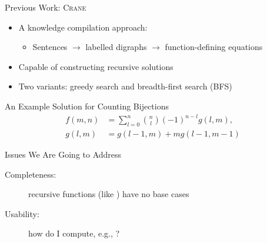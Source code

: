 \documentclass{beamer}
\begin{document}
\begin{frame}{Previous Work:
    \textsc{Crane}~}
  \begin{itemize}
    \item A knowledge compilation approach:
          \begin{itemize}
            \item \alert{Sentences} $\to$ labelled \alert{digraphs} $\to$
                  function-defining \alert{equations}
          \end{itemize}
    \item Capable of constructing recursive solutions
    \item Two variants: \alert{greedy} search and \alert{breadth-first search}
          (BFS)
  \end{itemize}
  \pause
  \begin{exampleblock}{An Example Solution for Counting Bijections}
    \begin{align*}
      f(m, n) &= \sum_{l=0}^{n} \binom{n}{l}{(-1)}^{n-l}g(l, m),\\
      g(l, m) &= g(l-1, m) + mg(l-1, m-1)
    \end{align*}
  \end{exampleblock}
  \pause
  \begin{alertblock}{Issues We Are Going to Address}
    \begin{description}
      \item[Completeness:] recursive functions (like ) have
            \alert{no base cases}
      \item[Usability:] how do I compute, e.g., ?
    \end{description}
  \end{alertblock}
\end{frame}


\end{document}
